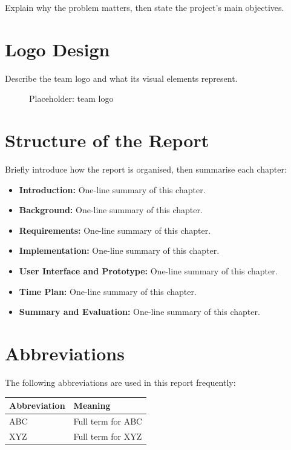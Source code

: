 \documentclass[
  12pt,
  a4paper,
]{report}
\newcounter{none} %
\providecommand{\tightlist}{%
  \setlength{\itemsep}{0pt}\setlength{\parskip}{0pt}}
\begin{document}
Explain why the problem matters, then state the project's main
objectives.

\section{Logo Design}\label{logo-design}

Describe the team logo and what its visual elements represent.

\begin{figure}
\centering
{}
\caption{Placeholder: team logo}
\end{figure}

\section{Structure of the Report}\label{structure-of-the-report}

Briefly introduce how the report is organised, then summarise each
chapter:

\begin{itemize}
\tightlist
\item
  \textbf{Introduction:} One-line summary of this chapter.
\item
  \textbf{Background:} One-line summary of this chapter.
\item
  \textbf{Requirements:} One-line summary of this chapter.
\item
  \textbf{Implementation:} One-line summary of this chapter.
\item
  \textbf{User Interface and Prototype:} One-line summary of this
  chapter.
\item
  \textbf{Time Plan:} One-line summary of this chapter.
\item
  \textbf{Summary and Evaluation:} One-line summary of this chapter.
\end{itemize}

\section{Abbreviations}\label{abbreviations}

The following abbreviations are used in this report frequently:

{\def\LTcaptype{none} %
\begin{longtable}[]{@{}ll@{}}
\toprule\noalign{}
Abbreviation & Meaning \\
\midrule\noalign{}
\endhead
\bottomrule\noalign{}
\endlastfoot
ABC & Full term for ABC \\
XYZ & Full term for XYZ \\
\end{longtable}
}
\end{document}
